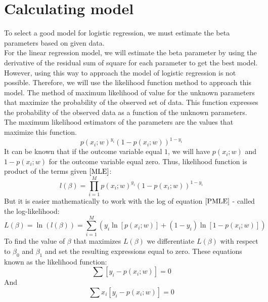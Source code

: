 \documentclass{article}
\begin{document}
\section {Calculating model} 
    To select a good model for logistic regression, we must estimate the beta parameters based on given data. 
    \\
    For the linear regression model, we will estimate the beta parameter by using the derivative of the residual sum of square for each parameter to get the best model. However, using this way to approach the model of logistic regression is not possible. Therefore, we will use the likelihood function method to approach this model. The method of maximum likelihood of value for the unknown parameters that maximize the probability of the observed set of data. This function expresses the probability of the observed data as a function of the unknown parameters. The maximum likelihood estimators of the parameters are the values that maximize this function.
    \begin{equation} 
        \label{MLE}
        p(x_{i};w)^{y_{i}}(1 - p(x_{i}; w))^{1 - y_{i}}
    \end{equation}
    It can be known that if the outcome variable equal $1$, we will have $p(x_{i}; w)$ and $1 - p(x_{i}; w)$ for the outcome variable equal zero. Thus, likelihood function is product of the terms given $\ref{MLE}$: 
    \begin{equation} 
        \label{PMLE}
        l(\beta) = \prod_{i=1}^{M} p(x_{i}; w)^{y_{i}}(1 - p(x_{i}; w))^{1 - y_{i}}
    \end{equation}
    But it is easier mathematically to work with the log of equation $\ref{PMLE}$ - called the log-likelihood: 
    \begin{equation} 
        \label{LLH}
        L(\beta) = \ln(l(\beta)) = \sum_{i=1}^{M} (y_{i}\ln[p(x_{i}; w)] + (1 - y_{i})\ln[1 -  p(x_{i}; w)])
    \end{equation}
    To find the value of $\beta$ that maximizes $L(\beta)$ we differentiate $L(\beta)$ with respect to $\beta_{0}$ and $\beta_{1}$ and set the resulting expressions equal to zero. These equations known as the likelihood function: 
    \begin{equation} 
        \label{ELF1}
        \sum \left[y_{i} -  p(x_{i}; w) \right]  = 0
    \end{equation} 
    And
    \begin{equation} 
        \label{ELF2}
        \sum x_{i}  \left[y_{i} -  p(x_{i}; w) \right]  = 0
    \end{equation}
\end{document}
